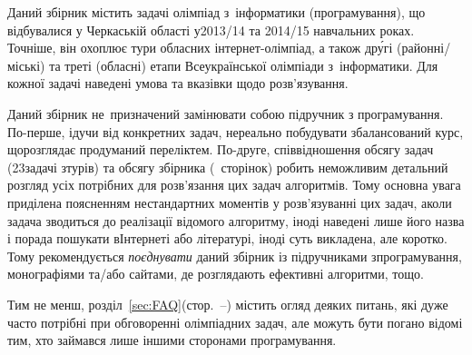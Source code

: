 \documentclass[14pt,a4paper]{extarticle}
\begin{document}
Даний збірник містить задачі олімпіад з~інформатики (програмування), що відбувалися у Черкаській області у\nolinebreak[2] \mbox{2013/14} та \mbox{2014/15} навчальних роках. Точніше, він охоплює тури обласних інтернет-олімпіад, а також др\'{у}гі (районні/\linebreak[1]міські) та треті (обласні) етапи Всеукраїнської олімпіади з~інформатики. Для кожної задачі наведені умова та вказівки щодо розв'язування.

Даний збірник не~призначений замінювати собою підручник з програмування. По-перше, ідучи від конкретних задач, нереально побудувати збалансований курс, що\nolinebreak[2] розглядає продуманий перелік\nolinebreak[2] тем. По-друге, співвідношення обсягу задач (23\nolinebreak[3] задачі з\nolinebreak[3] турів) та обсягу збірника \ifallIdeOneLinksCopiedHere\else(\pageref{LastPage}~сторінок) \fi{}робить немож\-ливим детальний розгляд усіх потрібних для розв'язання цих задач алгоритмів. Тому основна увага приділена поясненням нестандартних моментів у розв'язуванні цих задач, а\nolinebreak[3] коли задача зводиться до реалізації відомого алгоритму, іноді наведені лише його назва і порада пошукати в\nolinebreak[3] Інтернеті або літературі, іноді суть викладена, але коротко. Тому рекомендується \emph{поєднувати} даний збірник із підручниками з\nolinebreak[3] програмування, монографіями \mbox{та/або} сайтами, де розглядають ефективні алгоритми, тощо.

Тим не менш, розділ~\ref{sec:FAQ}\nolinebreak[3] (стор.~\pageref{sec:FAQ}--\nolinebreak[4]\pageref{text:FAQ-end}) містить огляд деяких питань, які дуже часто потрібні при обговоренні олімпіадних задач, але можуть бути погано відомі тим, хто займався лише іншими сторонами програмування.
\end{document}
